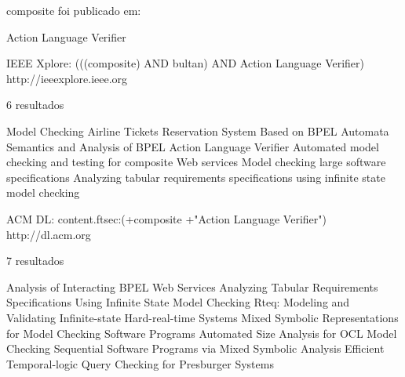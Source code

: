 composite foi publicado em:

Action Language Verifier

IEEE Xplore: (((composite) AND bultan) AND Action Language Verifier) 
http://ieeexplore.ieee.org

6 resultados

Model Checking Airline Tickets Reservation System Based on BPEL
Automata Semantics and Analysis of BPEL
Action Language Verifier
Automated model checking and testing for composite Web services
Model checking large software specifications
Analyzing tabular requirements specifications using infinite state model checking

ACM DL: content.ftsec:(+composite +"Action Language Verifier")
http://dl.acm.org

7 resultados

Analysis of Interacting BPEL Web Services
Analyzing Tabular Requirements Specifications Using Infinite State Model Checking
Rteq: Modeling and Validating Infinite-state Hard-real-time Systems
Mixed Symbolic Representations for Model Checking Software Programs
Automated Size Analysis for OCL
Model Checking Sequential Software Programs via Mixed Symbolic Analysis
Efficient Temporal-logic Query Checking for Presburger Systems
